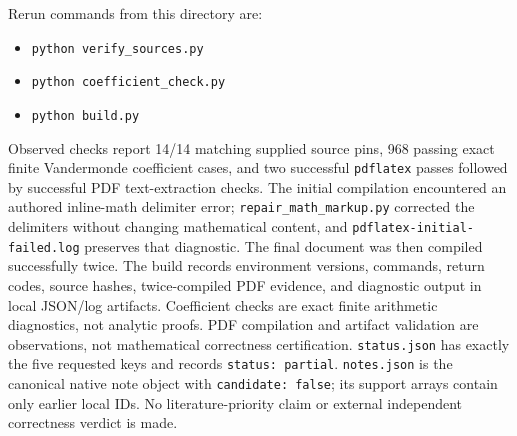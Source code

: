\documentclass[
  11pt,
]{article}
\providecommand{\tightlist}{%
  \setlength{\itemsep}{0pt}\setlength{\parskip}{0pt}}
\begin{document}
Rerun commands from this directory are:

\begin{itemize}
\tightlist
\item
  \texttt{python\ verify\_sources.py}
\item
  \texttt{python\ coefficient\_check.py}
\item
  \texttt{python\ build.py}
\end{itemize}

Observed checks report 14/14 matching supplied source pins, 968 passing
exact finite Vandermonde coefficient cases, and two successful
\texttt{pdflatex} passes followed by successful PDF text-extraction
checks. The initial compilation encountered an authored inline-math
delimiter error; \texttt{repair\_math\_markup.py} corrected the
delimiters without changing mathematical content, and
\texttt{pdflatex-initial-failed.log} preserves that diagnostic. The
final document was then compiled successfully twice. The build records
environment versions, commands, return codes, source hashes,
twice-compiled PDF evidence, and diagnostic output in local JSON/log
artifacts. Coefficient checks are exact finite arithmetic diagnostics,
not analytic proofs. PDF compilation and artifact validation are
observations, not mathematical correctness certification.
\texttt{status.json} has exactly the five requested keys and records
\texttt{status:\ partial}. \texttt{notes.json} is the canonical native
note object with \texttt{candidate:\ false}; its support arrays contain
only earlier local IDs. No literature-priority claim or external
independent correctness verdict is made.
\end{document}
